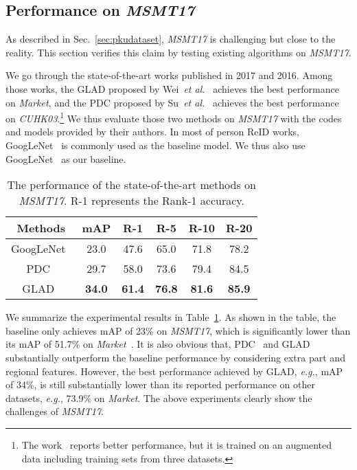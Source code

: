 \documentclass[10pt,twocolumn,letterpaper]{article}
\begin{document}
\subsection{Performance on \textbf{\emph{MSMT17}}}
\label{sec:MSMTTest}
As described in Sec.~\ref{sec:pkudataset}, \emph{MSMT17} is challenging but close to the reality. This section verifies this claim by testing existing algorithms on \emph{MSMT17}.

We go through the state-of-the-art works published in 2017 and 2016. Among those works, the GLAD proposed by Wei~\emph{et al.}~\cite{wei2017glad} achieves the best performance on \emph{Market}, and the PDC proposed by Su~\emph{et al.}~\cite{su2017pose} achieves the best performance on \emph{CUHK03}.\footnote{The work~\cite{liu2017hydraplus} reports better performance, but it is trained on an augmented data including training sets from three datasets.} We thus evaluate those two methods on \emph{MSMT17} with the codes and models provided by their authors. In most of person ReID works, GoogLeNet~\cite{szegedy2015going} is commonly used as the baseline model. We thus also use GoogLeNet~\cite{szegedy2015going} as our baseline.


\captionsetup{belowskip=-0cm}
\captionsetup{aboveskip=0.1cm}
\begin{table}
\footnotesize
\begin{center}
\caption{The performance of the state-of-the-art methods on \emph{MSMT17}. R-1 represents the Rank-1 accuracy.}\label{tab:tab4}
\begin{tabular}{c|c|c|c|c|c}
\hline
{Methods} &mAP&R-1 &R-5 &R-10 &R-20\\
\hline
\hline
GoogLeNet~\cite{szegedy2015going}     &23.0&47.6 &65.0&71.8&78.2\\
\hline
PDC~\cite{su2017pose} 	&29.7&58.0 &73.6 &79.4 &84.5\\
\hline
GLAD~\cite{wei2017glad}      &\textbf{34.0} &\textbf{61.4}&\textbf{76.8}&\textbf{81.6}&\textbf{85.9}\\
\hline
\end{tabular}
\end{center}
\end{table}



We summarize the experimental results in Table~\ref{tab:tab4}. As shown in the table, the baseline only achieves mAP of 23\% on \emph{MSMT17}, which is significantly lower than its mAP of 51.7\% on \emph{Market}~\cite{geng2016deep}. It is also obvious that, PDC~\cite{su2017pose} and GLAD~\cite{wei2017glad} substantially outperform the baseline performance by considering extra part and regional features. However, the best performance achieved by GLAD, \emph{e.g.}, mAP of 34\%, is still substantially lower than its reported performance on other datasets, \emph{e.g.}, 73.9\% on \emph{Market}. The above experiments clearly show the challenges of \emph{MSMT17}.
\end{document}
